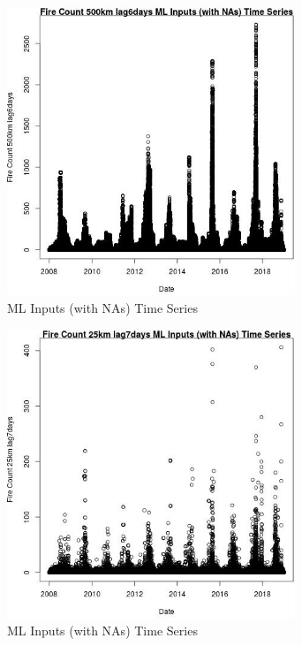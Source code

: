 \begin{figure} 
\centering  
\includegraphics[width=0.77\textwidth]{Code_Outputs/Report_ML_input_PM25_Step4_part_f_de_duplicated_aves_prioritize_24hr_obswNAs_Fire_Count_500km_lag6daysvDate.jpg} 
\caption{\label{fig:Report_ML_input_PM25_Step4_part_f_de_duplicated_aves_prioritize_24hr_obswNAsFire_Count_500km_lag6daysvDate}ML Inputs (with NAs) Time Series} 
\end{figure} 
 

\begin{figure} 
\centering  
\includegraphics[width=0.77\textwidth]{Code_Outputs/Report_ML_input_PM25_Step4_part_f_de_duplicated_aves_prioritize_24hr_obswNAs_Fire_Count_25km_lag7daysvDate.jpg} 
\caption{\label{fig:Report_ML_input_PM25_Step4_part_f_de_duplicated_aves_prioritize_24hr_obswNAsFire_Count_25km_lag7daysvDate}ML Inputs (with NAs) Time Series} 
\end{figure} 
 

